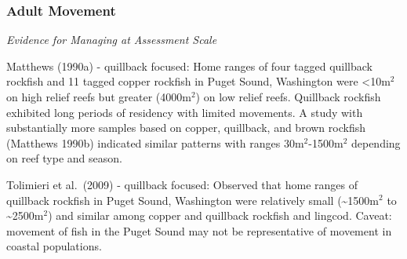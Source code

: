 \documentclass[11pt,
  english,
  letterpaper,
]{article}
\begin{document}
\tagmcend\tagstructend


\hypertarget{adult-movement}{%
\subsubsection{Adult Movement}\label{adult-movement}}

\leavevmode\tagmcend\tagstructend


\emph{Evidence for Managing at Assessment Scale}

\leavevmode\tagmcend\tagstructend\par


Matthews {(1990a)\leavevmode\tagmcend\tagstructend} - quillback focused: Home ranges of four tagged quillback rockfish and 11 tagged copper rockfish in Puget Sound, Washington were \textless10m{\(^2\)\leavevmode\tagmcend\tagstructend} on high relief reefs but greater (4000m{\(^2\)\leavevmode\tagmcend\tagstructend}) on low relief reefs. Quillback rockfish exhibited long periods of residency with limited movements. A study with substantially more samples based on copper, quillback, and brown rockfish {(Matthews 1990b)\leavevmode\tagmcend\tagstructend} indicated similar patterns with ranges 30m{\(^2\)\leavevmode\tagmcend\tagstructend}-1500m{\(^2\)\leavevmode\tagmcend\tagstructend} depending on reef type and season.

\leavevmode\tagmcend\tagstructend\par


Tolimieri et al.~{(2009)\leavevmode\tagmcend\tagstructend} - quillback focused: Observed that home ranges of quillback rockfish in Puget Sound, Washington were relatively small (\textasciitilde1500m{\(^2\)\leavevmode\tagmcend\tagstructend} to \textasciitilde2500m{\(^2\)\leavevmode\tagmcend\tagstructend}) and similar among copper and quillback rockfish and lingcod. Caveat: movement of fish in the Puget Sound may not be representative of movement in coastal populations.
\end{document}
